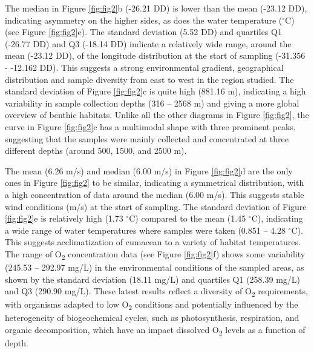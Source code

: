 The median in Figure \ref{fig:fig2}b (-26.21 DD) is lower than the mean (-23.12 DD), indicating asymmetry on the higher sides, as does the water temperature ($^\circ$C) (see Figure \ref{fig:fig2}e). The standard deviation (5.52 DD) and quartiles Q1 (-26.77 DD) and Q3 (-18.14 DD) indicate a relatively wide range, around the mean (-23.12 DD), of the longitude distribution at the start of sampling (-31.356 - -12.162 DD). This suggests a strong environmental gradient, geographical distribution and sample diversity from east to west in the region studied. The standard deviation of Figure \ref{fig:fig2}c is quite high (881.16 m), indicating a high variability in sample collection depths (316 – 2568 m) and giving a more global overview of benthic habitats. Unlike all the other diagrams in Figure \ref{fig:fig2}, the curve in Figure \ref{fig:fig2}c has a multimodal shape with three prominent peaks, suggesting that the samples were mainly collected and concentrated at three different depths (around 500, 1500, and 2500 m).

The mean (6.26 m/s) and median (6.00 m/s) in Figure \ref{fig:fig2}d are the only ones in Figure \ref{fig:fig2} to be similar, indicating a symmetrical distribution, with a high concentration of data around the median (6.00 m/s). This suggests stable wind conditions (m/s) at the start of sampling. The standard deviation of Figure \ref{fig:fig2}e is relatively high (1.73 $^\circ$C) compared to the mean (1.45 $^\circ$C), indicating a wide range of water temperatures where samples were taken (0.851 – 4.28 $^\circ$C). This suggests acclimatization of cumacean to a variety of habitat temperatures. The range of O\textsubscript{2} concentration data (see Figure \ref{fig:fig2}f) shows some variability (245.53 – 292.97 mg/L) in the environmental conditions of the sampled areas, as shown by the standard deviation (18.11 mg/L) and quartiles Q1 (258.39 mg/L) and Q3 (290.90 mg/L). These latest results reflect a diversity of O\textsubscript{2} requirements, with organisms adapted to low O\textsubscript{2} conditions and potentially influenced by the heterogeneity of biogeochemical cycles, such as photosynthesis, respiration, and organic decomposition, which have an impact dissolved O\textsubscript{2} levels as a function of depth.

